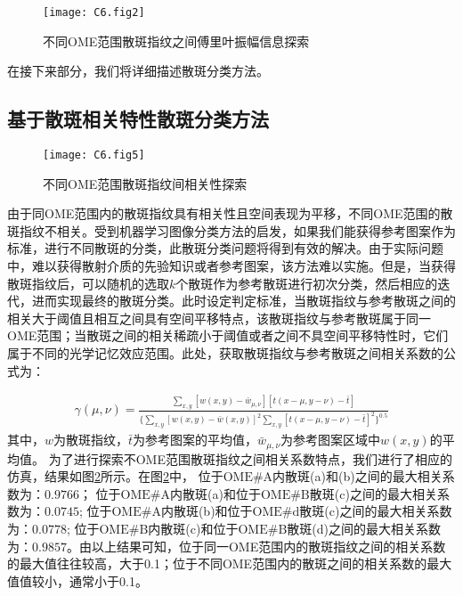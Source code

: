 \begin{figure}[htp]
	\centering
	\texttt{[image: C6.fig2]}
	\caption{不同OME范围散斑指纹之间傅里叶振幅信息探索}
	\label{fig:6.2}
\end{figure}
在接下来部分，我们将详细描述散斑分类方法。

\subsection{基于散斑相关特性散斑分类方法}

\begin{figure}[htp]
	\centering
	\texttt{[image: C6.fig5]}
	\caption{不同OME范围散斑指纹间相关性探索}
	\label{fig:6.5}
\end{figure}

由于同OME范围内的散斑指纹具有相关性且空间表现为平移，不同OME范围的散斑指纹不相关。受到机器学习图像分类方法的启发，如果我们能获得参考图案作为标准，进行不同散斑的分类，此散斑分类问题将得到有效的解决。由于实际问题中，难以获得散射介质的先验知识或者参考图案，该方法难以实施。但是，当获得散斑指纹后，可以随机的选取$k$个散斑作为参考散斑进行初次分类，然后相应的迭代，进而实现最终的散斑分类。此时设定判定标准，当散斑指纹与参考散斑之间的相关大于阈值且相互之间具有空间平移特点，该散斑指纹与参考散斑属于同一OME范围；当散斑之间的相关稀疏小于阈值或者之间不具空间平移特性时，它们属于不同的光学记忆效应范围。此处，获取散斑指纹与参考散斑之间相关系数的公式为：

\begin{equation}
\begin{aligned}
\gamma (\mu,\nu) = \frac{\sum_{x,y} [w(x,y)- \bar{w}_{\mu,\nu}] [t(x-\mu,y-\nu)- \bar{t}]}{\{ \sum_{x,y} [w(x,y)- \bar{w}(x,y)]^2 \sum_{x,y} [t(x-\mu,y-\nu)- \bar{t}]^2  \}^{0.5}}
\label{eq:6.5}
\end{aligned}
\end{equation}
其中，$w$为散斑指纹，$\bar{t}$为参考图案的平均值，$\bar{w}_{\mu,\nu}$为参考图案区域中$w(x,y)$的平均值。
为了进行探索不OME范围散斑指纹之间相关系数特点，我们进行了相应的仿真，结果如图\ref{fig:6.5}所示。在图\ref{fig:6.5}中，
位于$\mbox{OME} \# \mbox{A}$内散斑(a)和(b)之间的最大相关系数为：$0.9766$；
位于$\mbox{OME} \# \mbox{A}$内散斑(a)和位于$\mbox{OME} \# \mbox{B}$散斑(c)之间的最大相关系数为：$0.0745$;
位于$\mbox{OME} \# \mbox{A}$内散斑(b)和位于$\mbox{OME} \# \mbox{d}$散斑(c)之间的最大相关系数为：$0.0778$;
位于$\mbox{OME} \# \mbox{B}$内散斑(c)和位于$\mbox{OME} \# \mbox{B}$散斑(d)之间的最大相关系数为：$0.9857$。由以上结果可知，位于同一OME范围内的散斑指纹之间的相关系数的最大值往往较高，大于0.1；位于不同OME范围内的散斑之间的相关系数的最大值值较小，通常小于0.1。

